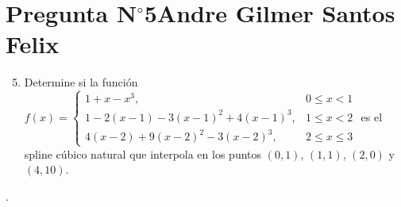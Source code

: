 \section{Pregunta N$^{\circ}$5\qquad Andre Gilmer Santos Felix}

\begin{frame}
    \begin{enumerate}\setcounter{enumi}{4}
        \item


              Determine si la función
              \begin{math}
                  f\left(x\right)=
                  \begin{cases}
                      1+
                      x-
                      x^{3},                   & 0 \leq x<1      \\
                      1-
                      2\left(x-1\right)-
                      3{\left(x-1\right)}^{2}+
                      4{\left(x-1\right)}^{3}, & 1 \leq x<2      \\
                      4\left(x-2\right)+
                      9{\left(x-2\right)}^{2}-
                      3{\left(x-2\right)}^{3}, & 2 \leq x \leq 3
                  \end{cases}
              \end{math}
              es el spline cúbico natural que interpola en los puntos
              $\left(0,1\right)$, $\left(1,1\right)$, $\left(2,0\right)$ y
              $\left(4,10\right)$.
    \end{enumerate}

    \begin{solution}
        .
    \end{solution}
\end{frame}